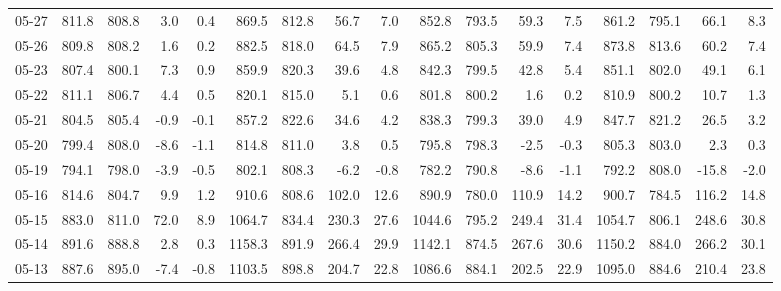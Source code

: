 \begin{threeparttable}
{\begin{tabular}{lrrrrrrrrrrrrrrrr}
  05-27 & 811.8 & 808.8 &        3.0 &            0.4 &  869.5 & 812.8 &       56.7 &            7.0 &  852.8 & 793.5 &       59.3 &            7.5 &  861.2 &  795.1 &        66.1 &              8.3 \\
  05-26 & 809.8 & 808.2 &        1.6 &            0.2 &  882.5 & 818.0 &       64.5 &            7.9 &  865.2 & 805.3 &       59.9 &            7.4 &  873.8 &  813.6 &        60.2 &              7.4 \\
  05-23 & 807.4 & 800.1 &        7.3 &            0.9 &  859.9 & 820.3 &       39.6 &            4.8 &  842.3 & 799.5 &       42.8 &            5.4 &  851.1 &  802.0 &        49.1 &              6.1 \\
  05-22 & 811.1 & 806.7 &        4.4 &            0.5 &  820.1 & 815.0 &        5.1 &            0.6 &  801.8 & 800.2 &        1.6 &            0.2 &  810.9 &  800.2 &        10.7 &              1.3 \\
  05-21 & 804.5 & 805.4 &       -0.9 &           -0.1 &  857.2 & 822.6 &       34.6 &            4.2 &  838.3 & 799.3 &       39.0 &            4.9 &  847.7 &  821.2 &        26.5 &              3.2 \\
  05-20 & 799.4 & 808.0 &       -8.6 &           -1.1 &  814.8 & 811.0 &        3.8 &            0.5 &  795.8 & 798.3 &       -2.5 &           -0.3 &  805.3 &  803.0 &         2.3 &              0.3 \\
  05-19 & 794.1 & 798.0 &       -3.9 &           -0.5 &  802.1 & 808.3 &       -6.2 &           -0.8 &  782.2 & 790.8 &       -8.6 &           -1.1 &  792.2 &  808.0 &       -15.8 &             -2.0 \\
  05-16 & 814.6 & 804.7 &        9.9 &            1.2 &  910.6 & 808.6 &      102.0 &           12.6 &  890.9 & 780.0 &      110.9 &           14.2 &  900.7 &  784.5 &       116.2 &             14.8 \\
  05-15 & 883.0 & 811.0 &       72.0 &            8.9 & 1064.7 & 834.4 &      230.3 &           27.6 & 1044.6 & 795.2 &      249.4 &           31.4 & 1054.7 &  806.1 &       248.6 &             30.8 \\
  05-14 & 891.6 & 888.8 &        2.8 &            0.3 & 1158.3 & 891.9 &      266.4 &           29.9 & 1142.1 & 874.5 &      267.6 &           30.6 & 1150.2 &  884.0 &       266.2 &             30.1 \\
  05-13 & 887.6 & 895.0 &       -7.4 &           -0.8 & 1103.5 & 898.8 &      204.7 &           22.8 & 1086.6 & 884.1 &      202.5 &           22.9 & 1095.0 &  884.6 &       210.4 &             23.8 \\

\end{tabular}}
\end{threeparttable}
